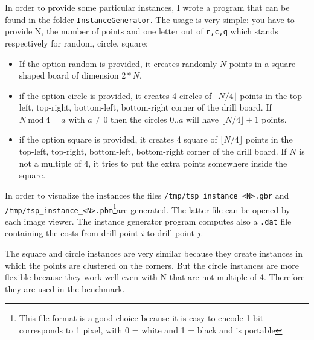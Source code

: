 In order to provide some particular instances, I wrote a program that can be found in the folder
\verb|InstanceGenerator|. The usage is very simple: you have to provide N, the number of points and
one letter out of \verb|r,c,q| which stands respectively for random, circle, square:
\begin{itemize}
	\item If the option random is provided, it creates randomly $N$ points in a square-shaped board of dimension $2*N$.
	\item if the option circle is provided, it creates 4 circles of $\lfloor{N/4}\rfloor$ points in the top-left, top-right, bottom-left, bottom-right corner
	of the drill board. If $N\ \text{mod} \ 4 = a$ with $a \neq 0$ then the circles $0..a$ will have $\lfloor{N/4}\rfloor + 1$ points.
	\item if the option square is provided, it creates 4 square of $\lfloor{N/4}\rfloor$ points in the top-left, top-right, bottom-left,
	bottom-right corner of the drill board. If $N$ is not a multiple of $4$, it tries to put the extra points somewhere inside the square.
\end{itemize}
In order to visualize the instances the files
\verb!/tmp/tsp_instance_<N>.gbr! and \verb!/tmp/tsp_instance_<N>.pbm!\footnote{This file format is a good choice because it is easy to encode 1 bit corresponds to 1 pixel, with 0 = white and 1 = black and is portable}are generated.
The latter file can be opened by each image viewer.
The instance generator program computes also a \verb|.dat| file containing the costs from drill point $i$ to drill point $j$.

The square and circle instances are very similar because they create instances in which the points are clustered on the corners.
But the circle instances are more flexible because they work well even with N that are not multiple of 4. Therefore they are used in the benchmark.